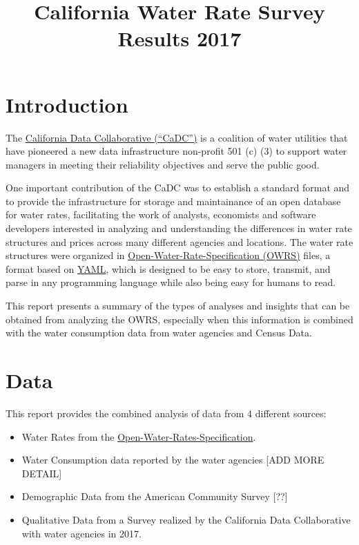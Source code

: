 \documentclass[]{article}
\title{California Water Rate Survey Results 2017}
\author{}
\date{}
\providecommand{\tightlist}{%
  \setlength{\itemsep}{0pt}\setlength{\parskip}{0pt}}
\begin{document}
\maketitle

\section{Introduction}\label{introduction}

The \href{http://californiadatacollaborative.org/}{California Data
Collaborative (``CaDC'')} is a coalition of water utilities that have
pioneered a new data infrastructure non-profit 501 (c) (3) to support
water managers in meeting their reliability objectives and serve the
public good.

One important contribution of the CaDC was to establish a standard
format and to provide the infrastructure for storage and maintainance of
an open database for water rates, facilitating the work of analysts,
economists and software developers interested in analyzing and
understanding the differences in water rate structures and prices across
many different agencies and locations. The water rate structures were
organized in
\href{https://github.com/California-Data-Collaborative/Open-Water-Rate-Specification}{Open-Water-Rate-Specification
(OWRS)} files, a format based on \href{http://yaml.org/}{YAML}, which is
designed to be easy to store, transmit, and parse in any programming
language while also being easy for humans to read.

This report presents a summary of the types of analyses and insights
that can be obtained from analyzing the OWRS, especially when this
information is combined with the water consumption data from water
agencies and Census Data.

\section{Data}\label{data}

This report provides the combined analysis of data from 4 different
sources:

\begin{itemize}
\tightlist
\item
  Water Rates from the
  \href{https://github.com/California-Data-Collaborative/Open-Water-Rate-Specification}{Open-Water-Rates-Specification}.
\item
  Water Consumption data reported by the water agencies {[}ADD MORE
  DETAIL{]}
\item
  Demographic Data from the American Community Survey {[}??{]}
\item
  Qualitative Data from a Survey realized by the California Data
  Collaborative with water agencies in 2017.
\end{itemize}
\end{document}
